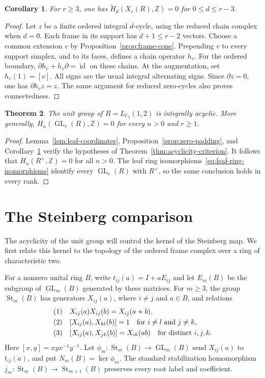 \documentclass[11pt]{amsart}
\newcommand{\Z}{\mathbb Z}
\newcommand{\F}{\mathbb F}
\DeclareMathOperator{\GL}{GL}
\DeclareMathOperator{\St}{St}
\DeclareMathOperator{\id}{id}
\newtheorem{theorem}{Theorem}[section]
\newtheorem{corollary}[theorem]{Corollary}
\theoremstyle{definition}
\theoremstyle{remark}
\numberwithin{equation}{section}
\newcommand{\eqrownum}[1][]{%
  \hbox{\refstepcounter{equation}%
    \if\relax\detokenize{#1}\relax\else\label{#1}\fi
    \normalfont(\theequation)}}
\begin{document}
\begin{corollary}\label{cor:frame-homology}
For $r\geq3$, one has $\widetilde H_d(X_r(R),\Z)=0$ for $0\leq d\leq r-3$.
\end{corollary}

\begin{proof}
Let $z$ be a finite ordered integral $d$-cycle, using the reduced chain complex when $d=0$. Each frame in its support has $d+1\leq r-2$ vectors. Choose a common extension $v$ by Proposition~\ref{prop:frame-cone}. Prepending $v$ to every support simplex, and to its faces, defines a chain operator $h_v$. For the ordered boundary, $\partial h_v+h_v\partial=\id$ on these chains. At the augmentation, set $h_v(1)=[v]$. All signs are the usual integral alternating signs. Since $\partial z=0$, one has $\partial h_vz=z$. The same argument for reduced zero-cycles also proves connectedness.
\end{proof}

\begin{theorem}\label{thm:acyclicity}
The unit group of $R=L_{\F_2}(1,2)$ is integrally acyclic. More generally, $H_n(\GL_r(R),\Z)=0$ for every $n>0$ and $r\geq1$.
\end{theorem}

\begin{proof}
Lemma~\ref{lem:leaf-coordinates}, Proposition~\ref{prop:zero-padding}, and Corollary~\ref{cor:frame-homology} verify the hypotheses of Theorem~\ref{thm:acyclicity-criterion}. It follows that $H_n(R^\times,\Z)=0$ for all $n>0$. The leaf ring isomorphisms~\eqref{eq:leaf-ring-isomorphisms} identify every $\GL_r(R)$ with $R^\times$, so the same conclusion holds in every rank.
\end{proof}

\section{The Steinberg comparison}
\label{sec:steinberg}

The acyclicity of the unit group will control the kernel of the Steinberg map. We first relate this kernel to the topology of the ordered frame complex over a ring of characteristic two.

For a nonzero unital ring $B$, write $t_{ij}(a)=I+aE_{ij}$ and let $E_m(B)$ be the subgroup of $\GL_m(B)$ generated by these matrices. For $m\geq3$, the group $\St_m(B)$ has generators $X_{ij}(a)$, where $i\ne j$ and $a\in B$, and relations
$$
\begin{aligned}
\eqrownum &\quad X_{ij}(a)X_{ij}(b)=X_{ij}(a+b),\\
\eqrownum &\quad [X_{ij}(a),X_{kl}(b)]=1 \quad \text{for }i\ne l\text{ and }j\ne k,\\
\eqrownum &\quad [X_{ij}(a),X_{jk}(b)]=X_{ik}(ab) \quad \text{for distinct }i,j,k.
\end{aligned}
$$
Here $[x,y]=xyx^{-1}y^{-1}$. Let $\phi_m:\St_m(B)\to\GL_m(B)$ send $X_{ij}(a)$ to $t_{ij}(a)$, and put $N_m(B)=\ker\phi_m$. The standard stabilization homomorphism $j_m:\St_m(B)\to\St_{m+1}(B)$ preserves every root label and coefficient.
\end{document}
